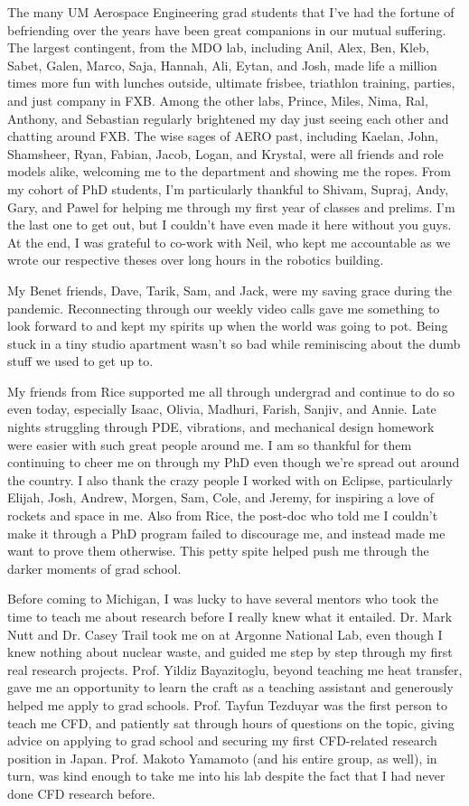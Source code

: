 The many UM Aerospace Engineering grad students that I've had the fortune of befriending over the years have been great companions in our mutual suffering. The largest contingent, from the MDO lab, including Anil, Alex, Ben, Kleb, Sabet, Galen, Marco, Saja, Hannah, Ali, Eytan, and Josh, made life a million times more fun with lunches outside, ultimate frisbee, triathlon training, parties, and just company in FXB. Among the other labs, Prince, Miles, Nima, Ral, Anthony, and Sebastian regularly brightened my day just seeing each other and chatting around FXB. The wise sages of AERO past, including Kaelan, John, Shamsheer, Ryan, Fabian, Jacob, Logan, and Krystal, were all friends and role models alike, welcoming me to the department and showing me the ropes. From my cohort of PhD students, I'm particularly thankful to Shivam, Supraj, Andy, Gary, and Pawel for helping me through my first year of classes and prelims. I'm the last one to get out, but I couldn't have even made it here without you guys. At the end, I was grateful to co-work with Neil, who kept me accountable as we wrote our respective theses over long hours in the robotics building. 

My Benet friends, Dave, Tarik, Sam, and Jack, were my saving grace during the pandemic. Reconnecting through our weekly video calls gave me something to look forward to and kept my spirits up when the world was going to pot. Being stuck in a tiny studio apartment wasn't so bad while reminiscing about the dumb stuff we used to get up to.

My friends from Rice supported me all through undergrad and continue to do so even today, especially Isaac, Olivia, Madhuri, Farish, Sanjiv, and Annie. Late nights struggling through PDE, vibrations, and mechanical design homework were easier with such great people around me. I am so thankful for them continuing to cheer me on through my PhD even though we're spread out around the country. I also thank the crazy people I worked with on Eclipse, particularly Elijah, Josh, Andrew, Morgen, Sam, Cole, and Jeremy, for inspiring a love of rockets and space in me. Also from Rice, the post-doc who told me I couldn't make it through a PhD program failed to discourage me, and instead made me want to prove them otherwise. This petty spite helped push me through the darker moments of grad school.

Before coming to Michigan, I was lucky to have several mentors who took the time to teach me about research before I really knew what it entailed. Dr. Mark Nutt and Dr. Casey Trail took me on at Argonne National Lab, even though I knew nothing about nuclear waste, and guided me step by step through my first real research projects. Prof. Yildiz Bayazitoglu, beyond teaching me heat transfer, gave me an opportunity to learn the craft as a teaching assistant and generously helped me apply to grad schools. Prof. Tayfun Tezduyar was the first person to teach me CFD, and patiently sat through hours of questions on the topic, giving advice on applying to grad school and securing my first CFD-related research position in Japan. Prof. Makoto Yamamoto (and his entire group, as well), in turn, was kind enough to take me into his lab despite the fact that I had never done CFD research before.

